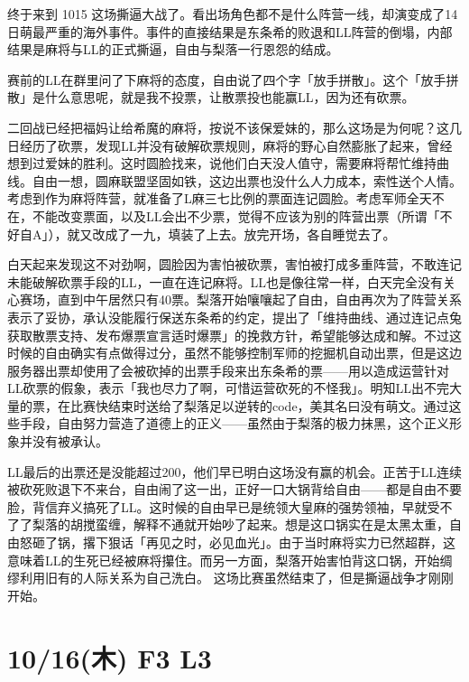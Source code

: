 终于来到 1015 这场撕逼大战了。看出场角色都不是什么阵营一线，却演变成了14日萌最严重的海外事件。事件的直接结果是东条希的败退和LL阵营的倒塌，内部结果是麻将与LL的正式撕逼，自由与梨落一行恩怨的结成。

赛前的LL在群里问了下麻将的态度，自由说了四个字「放手拼散」。这个「放手拼散」是什么意思呢，就是我不投票，让散票投也能赢LL，因为还有砍票。

二回战已经把福妈让给希魔的麻将，按说不该保爱妹的，那么这场是为何呢？这几日经历了砍票，发现LL并没有破解砍票规则，麻将的野心自然膨胀了起来，曾经想到过爱妹的胜利。这时圆脸找来，说他们白天没人值守，需要麻将帮忙维持曲线。自由一想，圆麻联盟坚固如铁，这边出票也没什么人力成本，索性送个人情。考虑到作为麻将阵营，就准备了L麻三七比例的票面连记圆脸。考虑军师全天不在，不能改变票面，以及LL会出不少票，觉得不应该为别的阵营出票（所谓「不好自A」），就又改成了一九，填装了上去。放完开场，各自睡觉去了。

白天起来发现这不对劲啊，圆脸因为害怕被砍票，害怕被打成多重阵营，不敢连记未能破解砍票手段的LL，一直在连记麻将。LL也是像往常一样，白天完全没有关心赛场，直到中午居然只有40票。梨落开始嚷嚷起了自由，自由再次为了阵营关系表示了妥协，承认没能履行保送东条希的约定，提出了「维持曲线、通过连记点兔获取散票支持、发布爆票宣言适时爆票」的挽救方针，希望能够达成和解。不过这时候的自由确实有点做得过分，虽然不能够控制军师的挖掘机自动出票，但是这边服务器出票却使用了会被砍掉的出票手段来出东条希的票——用以造成运营针对LL砍票的假象，表示「我也尽力了啊，可惜运营砍死的不怪我」。明知LL出不完大量的票，在比赛快结束时送给了梨落足以逆转的code，美其名曰没有萌文。通过这些手段，自由努力营造了道德上的正义——虽然由于梨落的极力抹黑，这个正义形象并没有被承认。

LL最后的出票还是没能超过200，他们早已明白这场没有赢的机会。正苦于LL连续被砍死败退下不来台，自由闹了这一出，正好一口大锅背给自由——都是自由不要脸，背信弃义搞死了LL。这时候的自由早已是统领大皇麻的强势领袖，早就受不了了梨落的胡搅蛮缠，解释不通就开始吵了起来。想是这口锅实在是太黑太重，自由怒砸了锅，撂下狠话「再见之时，必见血光」。由于当时麻将实力已然超群，这意味着LL的生死已经被麻将攥住。而另一方面，梨落开始害怕背这口锅，开始绸缪利用旧有的人际关系为自己洗白。
这场比赛虽然结束了，但是撕逼战争才刚刚开始。

\section{10/16(木) F3 L3}

